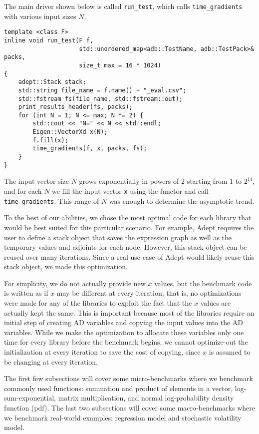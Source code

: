 The main driver shown below is called \verb|run_test|, which calls
\verb|time_gradients| with various input sizes $N$.
\begin{lstlisting}[style=customcpp]
template <class F>
inline void run_test(F f, 
                     std::unordered_map<adb::TestName, adb::TestPack>& packs,
                     size_t max = 16 * 1024) 
{
    adept::Stack stack;
    std::string file_name = f.name() + "_eval.csv";
    std::fstream fs(file_name, std::fstream::out);
    print_results_header(fs, packs);
    for (int N = 1; N <= max; N *= 2) {
        std::cout << "N=" << N << std::endl;
        Eigen::VectorXd x(N);
        f.fill(x);
        time_gradients(f, x, packs, fs);
    }
}
\end{lstlisting}
The input vector size $N$ grows exponentially in powers of $ 2$ starting from $ 1$ to
$2^{14}$, and for each $N$ we fill the input vector \verb|x| using the functor and call \verb|time_gradients|.
This range of $N$ was enough to determine the asymptotic trend.

To the best of our abilities, we chose the most optimal code for each library 
that would be best suited for this particular scenario.
For example, Adept requires the user to define a stack object that saves the 
expression graph as well as the temporary values and adjoints for each node.
However, this stack object can be reused over many iterations.
Since a real use-case of Adept would likely reuse this stack object, we made this optimization.

For simplicity, we do not actually provide new $x$ values, but the benchmark code
is written as if $x$ may be different at every iteration; that is,
no optimizations were made for any of the libraries to exploit the fact that 
the $x$ values are actually kept the same.
This is important because most of the libraries require an initial step of creating AD variables
and copying the input values into the AD variables.
While we make the optimization to allocate these variables only one time for every library before the benchmark begins,
we cannot optimize-out the initialization
at every iteration to save the cost of copying, since $x$ is assumed to be changing at every iteration.

The first few subsections will cover some micro-benchmarks where we benchmark commonly used functions: 
summation and product of elements in a vector, 
log-sum-exponential, 
matrix multiplication, 
and normal log-probability density function (pdf).
The last two subsections will cover some macro-benchmarks where we benchmark real-world examples: 
regression model and stochastic volatility model.








